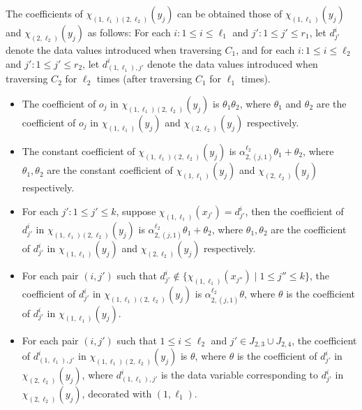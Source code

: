 \documentclass[runningheads,a4paper]{llncs}
\begin{document}
The coefficients of $\chi_{(1,\ell_1)(2,\ell_2)}(y_j)$ can be obtained those of $\chi_{(1,\ell_1)}(y_j)$ and $\chi_{(2,\ell_2)}(y_j)$ as follows: For each $i: 1 \le i \le \ell_1$ and $j': 1 \le j' \le r_1$, let $d^i_{j'}$ denote the data values introduced when traversing $C_1$, and for each  $i: 1 \le i \le \ell_2$ and $j': 1 \le j' \le r_2$, let $d^{i}_{(1, \ell_1),j'}$ denote the data values introduced when traversing $C_2$ for $\ell_2$ times (after traversing $C_1$ for $\ell_1$ times).
\begin{itemize}
\item The coefficient of $o_j$ in $\chi_{(1,\ell_1)(2,\ell_2)}(y_j)$ is $\theta_1\theta_2$, where $\theta_1$ and $\theta_2$ are the coefficient of $o_j$ in $\chi_{(1,\ell_1)}(y_j)$ and $\chi_{(2,\ell_2)}(y_j)$ respectively.
%
\item The constant coefficient of $\chi_{(1,\ell_1)(2,\ell_2)}(y_j)$ is $\alpha^{\ell_2}_{2,(j,1)} \theta_1 + \theta_2$, where $\theta_1,\theta_2$ are the constant coefficient of $\chi_{(1,\ell_1)}(y_j)$ and $\chi_{(2,\ell_2)}(y_j)$ respectively.
%
\item For each $j': 1 \le j' \le k$, suppose $\chi_{(1,\ell_1)}(x_{j'})=d^{i}_{j'}$, then the coefficient of $d^{i}_{j'}$ in $\chi_{(1,\ell_1)(2,\ell_2)}(y_j)$ is $\alpha^{\ell_2}_{2,(j,1)} \theta_1 + \theta_2$, where $\theta_1,\theta_2$ are the  coefficient of $d^i_{j'}$ in $\chi_{(1,\ell_1)}(y_j)$ and $\chi_{(2,\ell_2)}(y_j)$ respectively.  
%
%
\item For each pair $(i,j')$ such that $d^i_{j'} \not \in \{\chi_{(1,\ell_1)}(x_{j''}) \mid 1 \le j'' \le k\}$, the coefficient of $d^{i}_{j'}$ in $\chi_{(1,\ell_1)(2,\ell_2)}(y_j)$ is $\alpha^{\ell_2}_{2,(j,1)} \theta$, where $\theta$ is the  coefficient of $d^{i}_{j'}$ in $\chi_{(1,\ell_1)}(y_j)$.
%
\item For each pair $(i,j')$ such that $1 \le i \le \ell_2$ and $j' \in J_{2,3} \cup J_{2,4}$, the coefficient of $d^{i}_{(1, \ell_1),j'}$ in $\chi_{(1,\ell_1)(2,\ell_2)}(y_j)$ is $\theta$, where $\theta$ is the  coefficient of $d^{i}_{j'}$ in $\chi_{(2,\ell_2)}(y_j)$, where $d^{i}_{(1, \ell_1),j'}$ is the data variable corresponding to $d^{i}_{j'}$ in $\chi_{(2,\ell_2)}(y_j)$, decorated with $(1,\ell_1)$.
\end{itemize}
\end{document}

